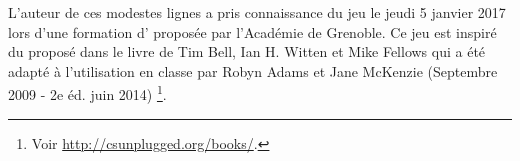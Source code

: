 L'auteur de ces modestes lignes a pris connaissance du jeu  le jeudi 5 janvier 2017 lors d'une formation d' proposée par l'Académie de Grenoble. Ce jeu est inspiré du  proposé dans le livre  de Tim Bell, Ian H. Witten et Mike Fellows qui a été adapté à l’utilisation en classe par Robyn Adams et Jane McKenzie (Septembre 2009 - 2e éd. juin 2014)
\footnote{
	Voir \url{http://csunplugged.org/books/}.
}. 
